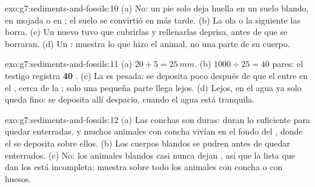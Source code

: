 \begin{solution}{exo:g7:sediments-and-fossils:10}
(a) No: un pie solo deja huella en un suelo blando, en  mojada o en
; el suelo se convirtió en  más tarde. (b) La ola o la 
siguiente las borra. (c) Un  nuevo tuvo que cubrirlas y
rellenarlas deprisa, antes de que se borraran. (d) Un : muestra lo
que hizo el animal, no una parte de su cuerpo.
\end{solution}

\begin{solution}{exo:g7:sediments-and-fossils:11}
(a) $20 + 5 = \qty{25}{mm}$. (b) $1000 \div 25 = 40$ pares: el testigo
registra \textbf{40 }. (c) La  es pesada: se deposita poco
después de que el  entre en el , cerca de la ; solo
una pequeña parte llega lejos. (d) Lejos, en el agua ya solo queda 
fino: se deposita allí despacio, cuando el agua está tranquila.
\end{solution}

\begin{solution}{exo:g7:sediments-and-fossils:12}
(a) Las conchas son duras: duran lo suficiente para quedar enterradas, y
muchos animales con concha vivían en el fondo del , donde el  se
deposita sobre ellos. (b) Los cuerpos blandos se pudren antes de quedar
enterrados. (c) No: los animales blandos casi nunca dejan , así que
la lista que dan los  está incompleta; muestra sobre todo los
animales con concha o con huesos.
\end{solution}

